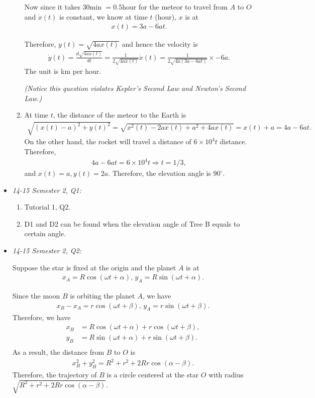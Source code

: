 \documentclass{article}
\begin{document}
\begin{itemize}
\begin{enumerate}[label=(\alph*)]
        Now since it takes $30$min $= 0.5$hour for the meteor to travel from $A$ to $O$ and $\dot x(t)$ is constant, we know at time $t$ (hour), $x$ is at
\begin{align*}
 x(t) = 3a - 6at.
\end{align*}

Therefore, $y(t) = \sqrt{4ax(t)}$ and hence the velocity is
\begin{align*}
  \dot y(t) = \frac{d\sqrt{4ax(t)}}{dt} = \frac{1}{2\sqrt{4ax(t)}} \dot x(t) = \frac{1}{2\sqrt{4a(3a - 6at)}} \times -6a.
\end{align*}
The unit is km per hour.

        \emph{(Notice this question violates Kepler's Second Law and Newton's Second Law.)}
      \item At time $t$, the distance of the meteor to the Earth is
\begin{align*}
  \sqrt{(x(t)-a)^2 + y(t)^2} = \sqrt{x^2(t)-2ax(t)+a^2 + 4ax(t)} = x(t) +a = 4a-6at.
\end{align*}
On the other hand, the rocket will travel a distance of $6\times 10^4 t$ distance. Therefore,
\begin{align*}
  4a-6at = 6\times 10^4 t \Rightarrow t = 1/3,
\end{align*}
and $x(t) = a, y(t) = 2a$. Therefore, the elevation angle is $90^\circ$.
      \end{enumerate}

\item \emph{14-15 Semester 2, Q1:}
  \begin{enumerate}[label=(\alph*)]
    \item Tutorial 1, Q2.
      
    \item D1 and D2 can be found when the elevation angle of Tree B equals to certain angle.

    \end{enumerate}
\item \emph{14-15 Semester 2, Q2:}

  Suppose the star is fixed at the origin and the planet $A$ is at
\begin{align*}
  x_A = R\cos (\omega t+\alpha),\,y_A = R \sin (\omega t+ \alpha).
\end{align*}

Since the moon $B$ is orbiting the planet $A$, we have
\begin{align*}
  x_B-x_A = r\cos(\omega t + \beta),\,y_A = r\sin(\omega t + \beta).
\end{align*}
Therefore, we have
\begin{align*}
  x_B &= R\cos (\omega t+ \alpha)+ r \cos (\omega t +\beta),\\
  y_B &= R\sin (\omega t+ \alpha)+ r \sin (\omega t +\beta).\\
\end{align*}
As a result, the distance from $B$ to $O$ is 
\begin{align*}
  x_B^2+y_B^2 = R^2+r^2 +2Rr \cos(\alpha-\beta).
\end{align*}
Therefore, the trajectory of $B$ is a circle centered at the star $O$ with radius $\sqrt{R^2+r^2 + 2Rr\cos(\alpha-\beta)}$.


\end{itemize}
\end{document}
